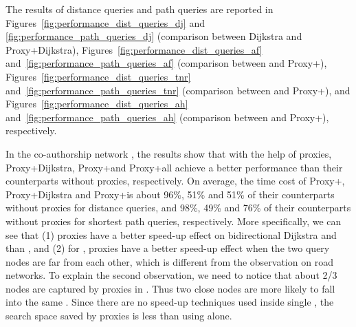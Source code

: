 The results of distance queries and path queries are reported in Figures~\ref{fig:performance_dist_queries_dj} and \ref{fig:performance_path_queries_dj} (comparison between Dijkstra and Proxy+Dijkstra), Figures~\ref{fig:performance_dist_queries_af} and~\ref{fig:performance_path_queries_af} (comparison between \arcflag and Proxy+\arcflag), Figures~\ref{fig:performance_dist_queries_tnr} and~\ref{fig:performance_path_queries_tnr} (comparison between \tnr and Proxy+\tnr), and Figures~\ref{fig:performance_dist_queries_ah} and~\ref{fig:performance_path_queries_ah} (comparison between \ah and Proxy+\ah), respectively.

In the co-authorship network \dblpone, the results show that with the help of proxies, Proxy+Dijkstra, Proxy+\arcflag and Proxy+\tnr all achieve a better performance than their counterparts without proxies, respectively. On average, the time cost of Proxy+\arcflag, Proxy+Dijkstra and Proxy+\tnr is about 96\%, 51\% and 51\% of their counterparts without proxies for distance queries, and 98\%, 49\% and 76\% of their counterparts without proxies for shortest path queries, respectively. More specifically, we can see that (1) proxies have a better speed-up effect on bidirectional Dijkstra and \tnr than \arcflag, and (2) for \arcflag, proxies have a better speed-up effect when the two query nodes are far from each other, which is different from the observation on road networks. To explain the second observation, we need to notice that about 2/3 nodes are captured by proxies in \dblpone. Thus two close nodes are more likely to fall into the same \dras. Since there are no speed-up techniques used inside single \dras, the search space saved by proxies is less than using \arcflag alone.

